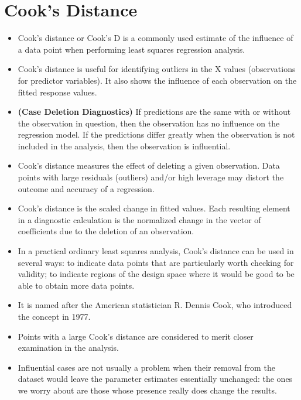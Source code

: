 \documentclass[residuals.tex]{subfiles}
\begin{document}
\Large
\section{Cook's Distance}	
	\begin{itemize}
		\item Cook's distance or Cook's D is a commonly used estimate of the influence of a data point when performing least squares regression analysis.
		
		\item Cook's distance is useful for identifying outliers in the X values (observations for predictor variables). It also shows the influence of each observation on the fitted response values. 
		\item \textbf{(Case Deletion Diagnostics)} If  predictions are the same with or without the observation in question, then the observation has no influence on the regression model. If the predictions differ greatly when the observation is not included in the analysis, then the observation is influential.
 \item Cook's distance measures the effect of deleting a given observation. Data points with large residuals (outliers) and/or high leverage may distort the outcome and accuracy of a regression. 
		
		\item 
		Cook's distance is the scaled change in fitted values. Each resulting element in a diagnostic calculation is the normalized change in the vector of coefficients due to the deletion of an observation. 
		
		\item In a practical ordinary least squares analysis, Cook's distance can be used in several ways: to indicate data points that are particularly worth checking for validity; to indicate regions of the design space where it would be good to be able to obtain more data points. 
		\item 
		It is named after the American statistician R. Dennis Cook, who introduced the concept in 1977.
		
		
		\item Points with a large Cook's distance are considered to merit closer examination in the analysis. 
		
		\item Influential cases are not usually a problem when their removal from the dataset would leave the parameter estimates essentially unchanged: the ones we worry about are those whose presence really does change the results. 
			\end{itemize}
\newpage
\end{document}
